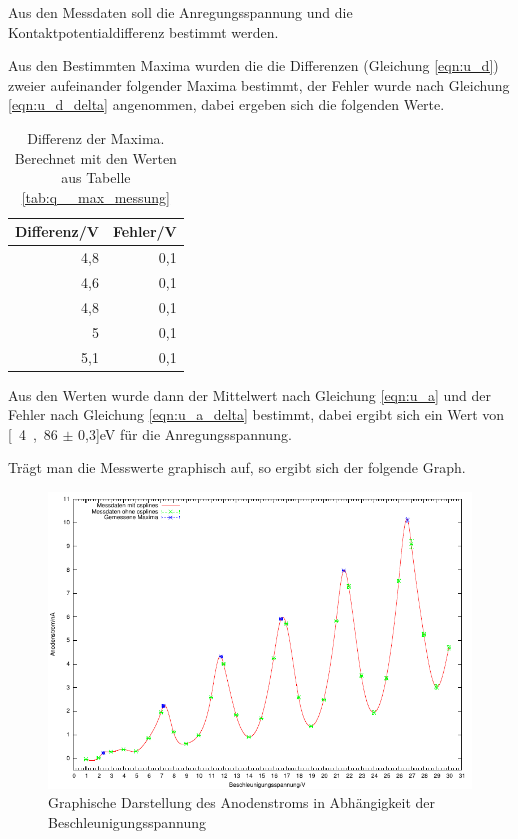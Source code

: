 \documentclass[12pt,a4paper]{article}
\begin{document}
Aus den Messdaten soll die Anregungsspannung und die Kontaktpotentialdifferenz bestimmt werden.

Aus den Bestimmten Maxima wurden die die Differenzen (Gleichung \ref{eqn:u_d}) zweier aufeinander folgender Maxima bestimmt, der Fehler wurde nach Gleichung \ref{eqn:u_d_delta} angenommen, dabei ergeben sich die folgenden Werte.

\begin{table}[H]
\caption{Differenz der Maxima. Berechnet mit den Werten aus Tabelle \ref{tab:q__max_messung} }
\begin{center}
\begin{tabular}{|r|r|}
\hline
\multicolumn{1}{|l|}{Differenz/V} & \multicolumn{1}{l|}{Fehler/V} \\ \hline
4,8 & 0,1 \\ \hline
4,6 & 0,1 \\ \hline
4,8 & 0,1 \\ \hline
5 & 0,1 \\ \hline
5,1 & 0,1 \\ \hline
\end{tabular}
\end{center}
\label{tab:q__diff}
\end{table}

Aus den Werten wurde dann der Mittelwert nach Gleichung \ref{eqn:u_a} und der Fehler nach Gleichung \ref{eqn:u_a_delta} bestimmt, dabei ergibt sich ein Wert von \unit[4,86 $\pm$ 0,3]{eV} für die Anregungsspannung.

Trägt man die Messwerte graphisch auf, so ergibt sich der folgende Graph.

\begin{figure}[H]
	\centering
	\includegraphics[scale= 1.5]{q_t.pdf}
	\caption{Graphische Darstellung des Anodenstroms in Abhängigkeit der Beschleunigungsspannung}
\end{figure}
\end{document}
